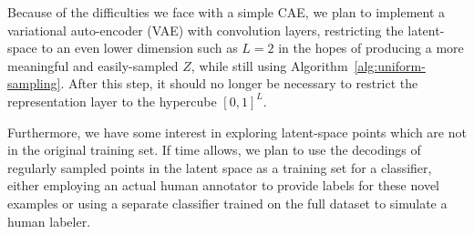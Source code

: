 \documentclass[a4paper]{article}
\begin{document}
Because of the difficulties we face with a simple CAE, we plan to implement a
variational auto-encoder (VAE) with convolution layers, restricting the
latent-space to an even lower dimension such as $L=2$ in the hopes of producing
a more meaningful and easily-sampled $Z$, while still using
Algorithm~\ref{alg:uniform-sampling}. After this step, it should no longer be
necessary to restrict the representation layer to the hypercube $[0,1]^L$.

Furthermore, we have some interest in exploring latent-space points which are
not in the original training set. If time allows, we plan to use the decodings
of regularly sampled points in the latent space as a training set for a
classifier, either employing an actual human annotator to provide labels for
these novel examples or using a separate classifier trained on the full dataset
to simulate a human labeler.




\newpage
\eightpt



\end{document}
